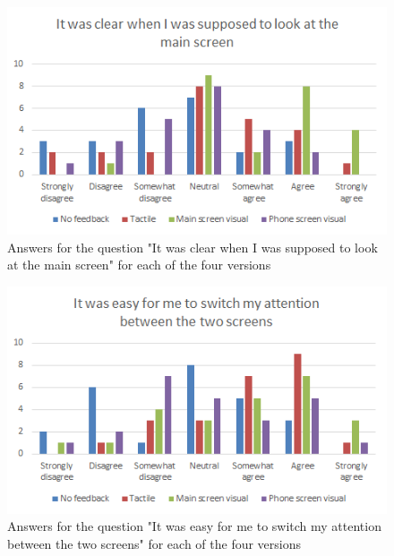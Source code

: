 \begin{figure}[hp!]
	\centering
	\includegraphics[scale=1]{figures/questionnaire_d.png}
	\caption{Answers for the question "It was clear when I was supposed to look at the main screen" for each of the four versions}\label{fig:questionnaire_d}
\end{figure}


\begin{figure}[hp!]
	\centering
	\includegraphics[scale=1]{figures/questionnaire_e.png}
	\caption{Answers for the question "It was easy for me to switch my attention between the two screens" for each of the four versions}\label{fig:questionnaire_e}
\end{figure}


